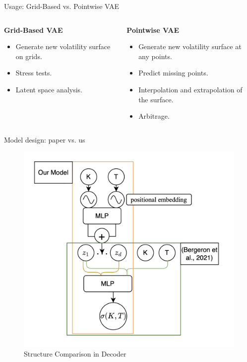 \documentclass{beamer}
\begin{document}
\begin{frame}{Usage: Grid-Based vs. Pointwise VAE}
\begin{columns}
    \begin{column}{0.48\textwidth}
        \textbf{Grid-Based VAE}
        \begin{itemize}
            \item Generate new volatility surface on grids.
            \item Stress tests.
            \item Latent space analysis.
        \end{itemize}
    \end{column}
    \begin{column}{0.48\textwidth}
    \textbf{Pointwise VAE}
\begin{itemize}
    \item Generate new volatility surface at any points.
    \item Predict missing points.
    \item Interpolation and extrapolation of the surface.
    \item Arbitrage.
\end{itemize}
    \end{column}
\end{columns}
\end{frame}

\begin{frame}{Model design: paper vs. us}
\begin{figure}
    \centering
    \includegraphics[width=0.65\linewidth]{docs/slides/img/model_design.png}
    \caption{Structure Comparison in Decoder}
    \label{fig:enter-label}
\end{figure}
    
\end{frame}
\end{document}
